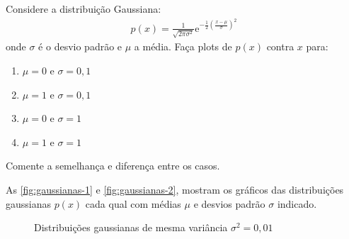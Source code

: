 \begin{prob}
  Considere a distribuição Gaussiana:
  \begin{align}
    p(x)=\frac{1}{\sqrt{2\pi\sigma^2}}\mathrm{e}^{-\frac{1}{2}\left(\frac{x-\mu}{\sigma}\right)^2}
  \end{align}
  onde $\sigma$ é o desvio padrão e $\mu$ a média. Faça plots de $p(x)$ contra $x$ para:
  \begin{enumerate}[label=\alph *)]
    \item $\mu=0$ e $\sigma=0,1$
    \item $\mu=1$ e $\sigma=0,1$
    \item $\mu=0$ e $\sigma=1$
    \item $\mu=1$ e $\sigma=1$
  \end{enumerate}
  Comente a semelhança e diferença entre os casos.
  \newpage
  \begin{sol}
  \par\noindent As \autoref{fig:gaussianas-1} e \autoref{fig:gaussianas-2}, mostram os gráficos das distribuições gaussianas $p(x)$ cada qual com médias $\mu$ e desvios padrão $\sigma$ indicado.
      \begin{figure}[!htb]
      \centering
      \hfill
      \caption{Distribuições gaussianas de mesma variância $\sigma^2=0,01$}
      \label{fig:gaussianas-1}       

\end{figure}
\end{sol}
\end{prob}
